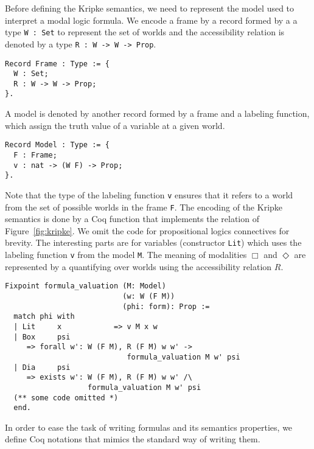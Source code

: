 \documentclass[sigconf,anonymous]{acmart}
\begin{document}
Before defining the Kripke semantics, we need to represent the model used to
interpret a modal logic formula. We encode a frame by a record formed by a
a type \texttt{W : Set} to represent the set of worlds and the
accessibility relation is denoted by a type \texttt{R : W -> W -> Prop}.
\begin{verbatim}
Record Frame : Type := {
  W : Set;
  R : W -> W -> Prop;
}.
\end{verbatim}
A model is denoted by another record formed by a frame and a labeling function,
which assign the truth value of a variable at a given world.
\begin{verbatim}
Record Model : Type := {
  F : Frame; 
  v : nat -> (W F) -> Prop; 
}.
\end{verbatim}
Note that the type of the labeling function \texttt{v} ensures that it
refers to a world from the set of possible worlds in the frame
\texttt{F}. The encoding of the Kripke semantics is done by a Coq function
that implements the relation of Figure~\ref{fig:kripke}. We omit the code
for propositional logics connectives for brevity. The interesting parts are for
variables (constructor \texttt{Lit}) which uses the labeling function
\texttt{v} from the model \texttt{M}. The meaning of
modalities $\Box$ and $\Diamond$ are represented by a quantifying over worlds
using the accessibility relation $R$. 
\begin{verbatim}
Fixpoint formula_valuation (M: Model)
                           (w: W (F M))
                           (phi: form): Prop :=
  match phi with
  | Lit     x            => v M x w 
  | Box     psi
     => forall w': W (F M), R (F M) w w' ->
                            formula_valuation M w' psi
  | Dia     psi
     => exists w': W (F M), R (F M) w w' /\
                   formula_valuation M w' psi
  (** some code omitted *)
  end.
\end{verbatim}
In order to ease the task of writing formulas and its semantics properties, we
define Coq notations that mimics the standard way of writing them.
\end{document}
